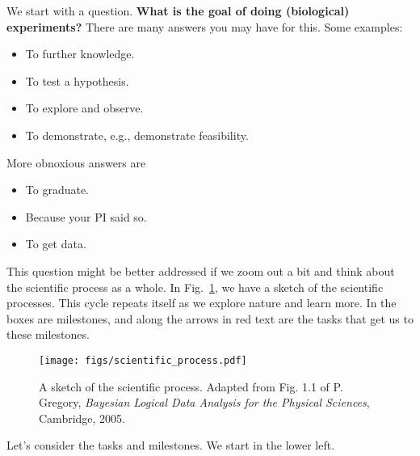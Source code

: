 We start with a question.  \textbf{What is the goal of doing
  (biological) experiments?}  There are many answers you may have for
this.  Some examples:
\begin{itemize}
\item To further knowledge.
\item To test a hypothesis.
\item To explore and observe.
\item To demonstrate, e.g., demonstrate feasibility.
\end{itemize}

More obnoxious answers are
\begin{itemize}
\item To graduate.
\item Because your PI said so.
\item To get data.
\end{itemize}

This question might be better addressed if we zoom out a bit and think
about the scientific process as a whole.  In
Fig.~\ref{fig:scientific_process}, we have a sketch of the scientific
processes.  This cycle repeats itself as we explore nature and learn
more.  In the boxes are milestones, and along the arrows in red text
are the tasks that get us to these milestones.

\begin{figure}[h]
\centerline{
        \texttt{[image: figs/scientific\_process.pdf]}}
      \caption{A sketch of the scientific process.  Adapted from
        Fig. 1.1 of P. Gregory, \textit{Bayesian Logical Data Analysis
          for the Physical Sciences}, Cambridge, 2005.}
\label{fig:scientific_process}
\end{figure}

Let's consider the tasks and milestones.  We start in the lower left.

